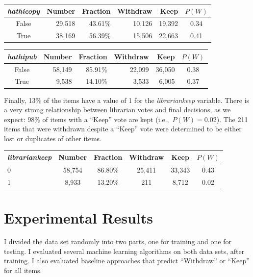 \documentclass[man,11pt]{apa6}
\begin{document}
\singlespacing
\begin{center}
\begin{tabular}{|c|rr|rr|c|}
\hline
{\em hathicopy} & Number & Fraction & Withdraw & Keep & $P(W)$\\ \hline
False & 29,518 & 43.61\% & 10,126 & 19,392 & 0.34 \\
True  & 38,169 & 56.39\% & 15,506 & 22,663 & 0.41 \\
\hline
\end{tabular}
\end{center}
\doublespacing

\singlespacing
\begin{center}
\begin{tabular}{|c|rr|rr|c|}
\hline
{\em hathipub} & Number & Fraction & Withdraw & Keep & $P(W)$\\ \hline
False & 58,149 & 85.91\% & 22,099 & 36,050 & 0.38 \\
True  &  9,538 & 14.10\% &  3,533 &  6,005 & 0.37 \\
\hline
\end{tabular}
\end{center}
\doublespacing

Finally, 13\% of the items have a value of 1 for the {\em
  librariankeep} variable.  There is a very strong relationship
between librarian votes and final decisions, as we expect: 98\% of
items with a ``Keep'' vote are kept (i.e.,~$P(W) = 0.02$).  The 211
items that were withdrawn despite a ``Keep'' vote were determined to
be either lost or duplicates of other items.

\singlespacing
\begin{center}
\begin{tabular}{|l|cc|cc|c|}
\hline
{\em librariankeep} & Number & Fraction & Withdraw & Keep & $P(W)$\\ \hline
0 & 58,754 & 86.80\% & 25,411 & 33,343 & 0.43 \\
1 &  8,933 & 13.20\% &    211 &  8,712 & 0.02 \\
\hline
\end{tabular}
\end{center}
\doublespacing


\section{Experimental Results}

I divided the data set randomly into two parts, one for training and
one for testing.  I evaluated several machine learning algorithms on
both data sets, after training.  I also evaluated baseline approaches
that predict ``Withdraw'' or ``Keep'' for all items.
\end{document}
